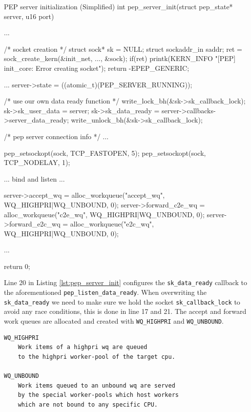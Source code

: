 \documentclass[a4paper,english, 12pt]{report}
\begin{document}
\begin{autonumlstlisting}[label=lst:pep_server_init]{PEP server initialization (Simplified)}
int pep_server_init(struct pep_state* server, u16 port)
{
	...

	/* socket creation */
	struct sock* sk = NULL;
	struct sockaddr_in saddr;
	ret = sock_create_kern(&init_net, ..., &sock);
	if(ret){
			printk(KERN_INFO "[PEP] init_core: Error creating socket\n");
			return -EPEP_GENERIC;
	}

	...
	server->state = ((atomic_t){(PEP_SERVER_RUNNING)});
	
	/* use our own data ready function */
	write_lock_bh(&sk->sk_callback_lock);
	sk->sk_user_data = server;
	sk->sk_data_ready = server->callbacks->server_data_ready;
	write_unlock_bh(&sk->sk_callback_lock);

	/* pep server connection info */
	...

	pep_setsockopt(sock, TCP_FASTOPEN, 5);
	pep_setsockopt(sock, TCP_NODELAY, 1);
	
	... bind and listen ...

	server->accept_wq = alloc_workqueue("accept_wq", WQ_HIGHPRI|WQ_UNBOUND, 0);
	server->forward_c2e_wq = alloc_workqueue("c2e_wq", WQ_HIGHPRI|WQ_UNBOUND, 0);
	server->forward_e2c_wq = alloc_workqueue("e2c_wq", WQ_HIGHPRI|WQ_UNBOUND, 0);

	...

	return 0;
}
\end{autonumlstlisting}

Line 20 in Listing \ref{lst:pep_server_init} configures the \verb|sk_data_ready| callback to the aforementioned \verb|pep_listen_data_ready|. When overwriting the \verb|sk_data_ready| we need to make sure we hold the socket \verb|sk_callback_lock| to avoid any race conditions, this is done in line 17 and 21. The accept and forward work queues are allocated and created with \verb|WQ_HIGHPRI| and \verb|WQ_UNBOUND|.\\

\noindent\begin{minipage}{\linewidth}
\begin{verbatim}
WQ_HIGHPRI
    Work items of a highpri wq are queued
    to the highpri worker-pool of the target cpu.

WQ_UNBOUND
    Work items queued to an unbound wq are served
    by the special worker-pools which host workers
    which are not bound to any specific CPU.
\end{verbatim}
\end{minipage}\\
\end{document}
